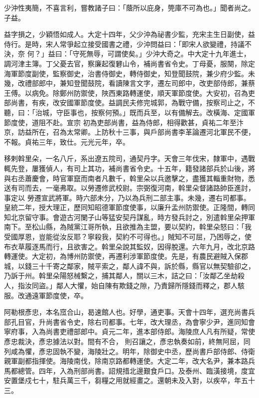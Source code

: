 \begin{pinyinscope}
 少沖性夷簡，不喜言利，嘗教諸子曰：「蔭所以庇身，筦庫不可為也。」聞者尚之。子益。



 益字損之，少穎悟如成人。大定十四年，父少沖為祕書少監，充宋主生日副使，益侍行。是時，宋人常爭起立接受國書之禮，少沖問益曰：「即宋人欲變禮，持議不決，奈
 何？」益曰：「守死無辱，可謂使矣。」少沖大奇之。中大定十九年進士，調河津主簿。丁父憂去官，察廉起復礬山令，補尚書省令史。丁母憂，服闋，除定海軍節度副使，監察御史，治書侍御史，轉侍御史，知登聞鼓院，兼少府少監。未幾，改禮部郎中，兼知登聞鼓院，看讀陳言文字，遷左司郎中，改吏部侍郎，兼蔡王傅。以病免。除鄭州防禦使，陜西東路轉運使，順天軍節度使。大安初，召為吏部尚書，有疾，改安國軍節度使。益調民夫修完城郭，為戰守備，按察司止之，不聽，曰：「治城，守臣事也，按察何預。」既而兵至，以有備解去。改橫海、定國軍節度使，道阻不赴。宣宗
 初為吏部尚書，益為侍郎，相得歡甚，貞祐二年至汴京，訪益所在，召為太常卿。上防秋十三事，與戶部尚書李革論遷河北軍民不便，不報。貞祐三年，致仕。元光元年，卒。



 移剌斡里朵，一名八斤，系出遼五院司，通契丹字。天會三年伐宋，隸軍中，遇戰輒先登，屢獲偵人，有司上其功，補尚書省令史。十五年，籍發諸部兵於山後，將與右丞蕭慶會，時官軍竄而南者凡數千，斡里朵以兵邀擊之，盡獲其輜重財物，悉送有司而去，一毫弗取。以勞遷修武校尉。宗弼復河南，斡里朵督諸路帥臣進討，事定以
 勞遷宣武將軍。時六部未分，乃以為兵刑二部主事。未幾，遷右司都事。皇統二年，授大理正，歷同知昭德軍節度使事，以廉升孟州防禦使。正隆間，轉同知北京留守事。會遊古河闌子山等猛安契丹謀亂，時方發兵討之，別遣斡里朵押軍南下。至松山縣，為賊黨江哥所執，且欲推為主盟，要以契約，斡里朵怒曰：「我受國厚恩，豈能從汝反耶？寧殺我，契約不可得也。」賊知不可屈，乃困辱之，使布衣草履逐馬而行，且欲害之。斡里朵說其監奴，因得脫還。六年九月，改北京路轉運使。大定初，為博州防禦使，再遷利涉軍節度使。先是，有農民避賊入保郡
 城，以錢三十千寄之鄰家，賊平索之，鄰人諱不與，訴於縣，縣官以無契驗卻之，乃訴于州。斡里朵陽怒械繫之，捕其鄰人，關以三木，詰之曰：「汝鄰乙坐劫殺人，指汝同盜。」鄰人大懼，始自陳有欺錢之隙，乃責歸所隱錢而釋之，郡人駭服。改通遠軍節度使，卒。



 阿勒根彥忠，本名窊合山，曷速館人也。好學，通吏事。天會十四年，選充尚書兵部孔目官，升尚書省令史，除右司都事。七年，改大理丞，為會寧少尹，進同知會寧府事，入為尚書吏禮部郎中。貞元二年，進本部侍郎。海陵庶人凡有所疑，常使彥忠裁決，彥忠據法以對。間有不合，
 則召讓之，彥忠執奏如前，終無阿屈，同列咸為懼，彥忠固執不變，海陵壯之。明年，除御史中丞，歷尚書戶部侍郎、侍衛親軍副都指揮使。海陵南伐，除南京路都轉運使。大定二年，改大名尹，兼本路兵馬都總管。四年，入為刑部尚書。詔規措北邊艱食戶口。及泰州、臨潢接境，度宜安置堡戍七十，駐兵萬三千，芻糧之用就經畫之。還朝未及入對，以疾卒，年五十三。




\end{pinyinscope}
